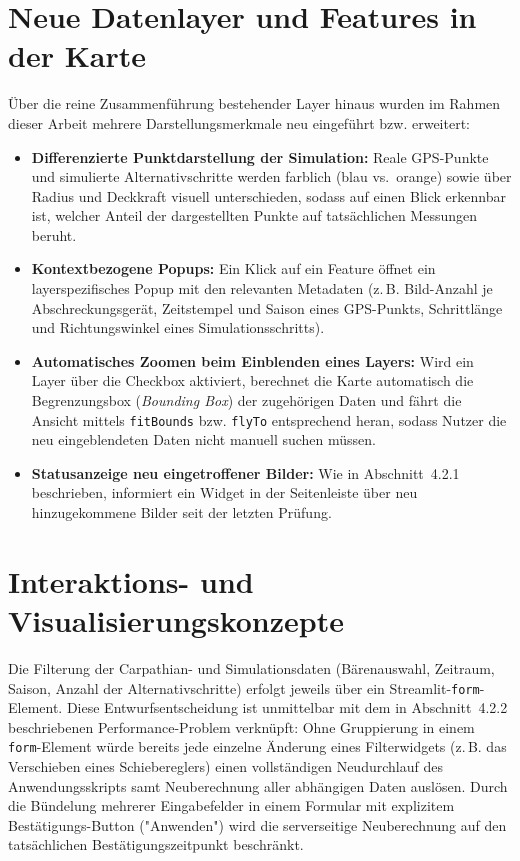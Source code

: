 \documentclass[12pt,a4paper]{report}
\begin{document}
\section{Neue Datenlayer und Features in der Karte}

Über die reine Zusammenführung bestehender Layer hinaus wurden im Rahmen dieser Arbeit mehrere Darstellungsmerkmale neu eingeführt bzw. erweitert:

\begin{itemize}
    \item \textbf{Differenzierte Punktdarstellung der Simulation:} Reale GPS-Punkte und simulierte Alternativschritte werden farblich (blau vs.\ orange) sowie über Radius und Deckkraft visuell unterschieden, sodass auf einen Blick erkennbar ist, welcher Anteil der dargestellten Punkte auf tatsächlichen Messungen beruht.
    \item \textbf{Kontextbezogene Popups:} Ein Klick auf ein Feature öffnet ein layerspezifisches Popup mit den relevanten Metadaten (z.\,B. Bild-Anzahl je Abschreckungsgerät, Zeitstempel und Saison eines GPS-Punkts, Schrittlänge und Richtungswinkel eines Simulationsschritts).
    \item \textbf{Automatisches Zoomen beim Einblenden eines Layers:} Wird ein Layer über die Checkbox aktiviert, berechnet die Karte automatisch die Begrenzungsbox (\emph{Bounding Box}) der zugehörigen Daten und fährt die Ansicht mittels \texttt{fitBounds} bzw. \texttt{flyTo} entsprechend heran, sodass Nutzer die neu eingeblendeten Daten nicht manuell suchen müssen.
    \item \textbf{Statusanzeige neu eingetroffener Bilder:} Wie in Abschnitt~4.2.1 beschrieben, informiert ein Widget in der Seitenleiste über neu hinzugekommene Bilder seit der letzten Prüfung.
\end{itemize}

\section{Interaktions- und Visualisierungskonzepte}
\label{sec:interaktion}

Die Filterung der Carpathian- und Simulationsdaten (Bärenauswahl, Zeitraum, Saison, Anzahl der Alternativschritte) erfolgt jeweils über ein Streamlit-\texttt{form}-Element. Diese Entwurfsentscheidung ist unmittelbar mit dem in Abschnitt~4.2.2 beschriebenen Performance-Problem verknüpft: Ohne Gruppierung in einem \texttt{form}-Element würde bereits jede einzelne Änderung eines Filterwidgets (z.\,B. das Verschieben eines Schiebereglers) einen vollständigen Neudurchlauf des Anwendungsskripts samt Neuberechnung aller abhängigen Daten auslösen. Durch die Bündelung mehrerer Eingabefelder in einem Formular mit explizitem Bestätigungs-Button ("Anwenden") wird die serverseitige Neuberechnung auf den tatsächlichen Bestätigungszeitpunkt beschränkt.
\end{document}
